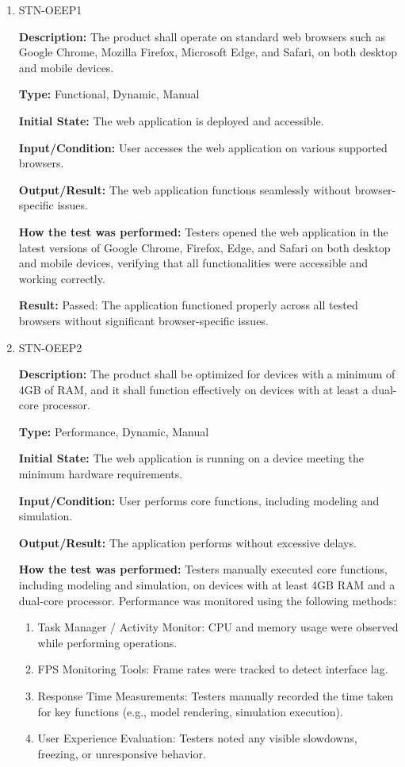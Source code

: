 \documentclass[12pt, titlepage]{article}
\begin{document}
\begin{enumerate}

\item{STN-OEEP1}

\textbf{Description:} The product shall operate on standard web browsers such as Google Chrome, Mozilla Firefox, Microsoft Edge, and Safari, on both desktop and mobile devices.

\textbf{Type:} Functional, Dynamic, Manual

\textbf{Initial State:} The web application is deployed and accessible.

\textbf{Input/Condition:} User accesses the web application on various supported browsers.

\textbf{Output/Result:} The web application functions seamlessly without browser-specific issues.

\textbf{How the test was performed:} Testers opened the web application in the latest versions of Google Chrome, Firefox, Edge, and Safari on both desktop and mobile devices, verifying that all functionalities were accessible and working correctly.

\textbf{Result:} Passed: The application functioned properly across all tested browsers without significant browser-specific issues.

\item{STN-OEEP2\\}

\textbf{Description:} The product shall be optimized for devices with a minimum of 4GB of RAM, and it shall function effectively on devices with at least a dual-core processor.

\textbf{Type:} Performance, Dynamic, Manual

\textbf{Initial State:} The web application is running on a device meeting the minimum hardware requirements.

\textbf{Input/Condition:} User performs core functions, including modeling and simulation.

\textbf{Output/Result:} The application performs without excessive delays.

\textbf{How the test was performed:} Testers manually executed core functions, including modeling and simulation, on devices with at least 4GB RAM and a dual-core processor. Performance was monitored using the following methods:
\begin{enumerate}
  \item Task Manager / Activity Monitor: CPU and memory usage were observed while performing operations.
  \item FPS Monitoring Tools: Frame rates were tracked to detect interface lag.
  \item Response Time Measurements: Testers manually recorded the time taken for key functions (e.g., model rendering, simulation execution).
  \item User Experience Evaluation: Testers noted any visible slowdowns, freezing, or unresponsive behavior.
\end{enumerate}


\end{enumerate}
\end{document}
